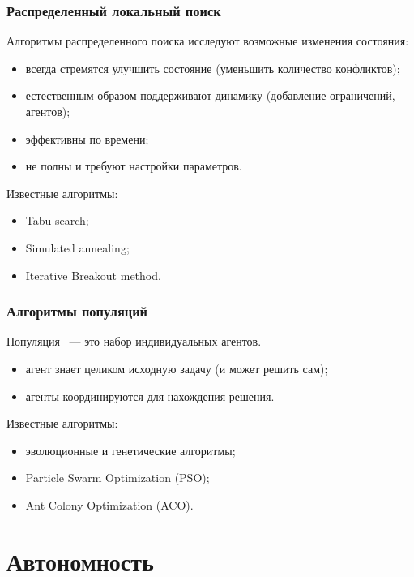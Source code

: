 \documentclass{beamer}
\begin{document}
\begin{frame}
  \frametitle{Распределенный локальный поиск}
  Алгоритмы распределенного поиска исследуют возможные изменения состояния:
  \begin{itemize}
    \item всегда стремятся улучшить состояние (уменьшить количество конфликтов);
    \item естественным образом поддерживают динамику (добавление ограничений, агентов);
    \item эффективны по времени;
    \item не полны и требуют настройки параметров.
  \end{itemize}

  Известные алгоритмы:
  \begin{itemize}
    \item Tabu search;
    \item Simulated annealing;
    \item Iterative Breakout method.
  \end{itemize}
\end{frame}

\begin{frame}
  \frametitle{Алгоритмы популяций}
  Популяция ~--- это набор индивидуальных агентов.
  \begin{itemize}
    \item агент знает целиком исходную задачу (и может решить сам);
    \item агенты координируются для нахождения решения.
  \end{itemize}

  Известные алгоритмы:
  \begin{itemize}
    \item эволюционные и генетические алгоритмы;
    \item Particle Swarm Optimization (PSO);
    \item Ant Colony Optimization (ACO).
  \end{itemize}
\end{frame}

\section{Автономность}
\end{document}
